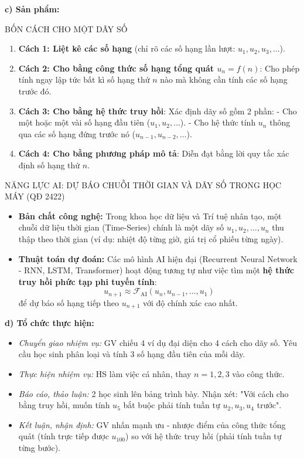 \documentclass[12pt, a4paper]{article}
\begin{document}
\noindent \textbf{c) Sản phẩm:}  
  
\begin{pedabox}{BỐN CÁCH CHO MỘT DÃY SỐ}  
\begin{enumerate}[leftmargin=0.6cm]  
    \item \textbf{Cách 1: Liệt kê các số hạng} (chỉ rõ các số hạng lần lượt: $u_1, u_2, u_3,\dots$).  
    \item \textbf{Cách 2: Cho bằng công thức số hạng tổng quát $u_n = f(n)$}:  
    Cho phép tính ngay lập tức bất kì số hạng thứ $n$ nào mà không cần tính các số hạng trước đó.  
    \item \textbf{Cách 3: Cho bằng hệ thức truy hồi}:  
    Xác định dãy số gồm 2 phần:  
    - Cho một hoặc một vài số hạng đầu tiên ($u_1, u_2,\dots$).  
    - Cho hệ thức tính $u_n$ thông qua các số hạng đứng trước nó ($u_{n-1}, u_{n-2},\dots$).  
    \item \textbf{Cách 4: Cho bằng phương pháp mô tả}:  
    Diễn đạt bằng lời quy tắc xác định số hạng thứ $n$.  
\end{enumerate}  
\end{pedabox}  
  
\begin{aibox}{NĂNG LỰC AI: DỰ BÁO CHUỖI THỜI GIAN VÀ DÃY SỐ TRONG HỌC MÁY (QĐ 2422)}  
\begin{itemize}[leftmargin=0.6cm]  
    \item \textbf{Bản chất công nghệ:} Trong khoa học dữ liệu và Trí tuệ nhân tạo, một chuỗi dữ liệu thời gian (Time-Series) chính là một dãy số $u_1, u_2, \dots, u_n$ thu thập theo thời gian (ví dụ: nhiệt độ từng giờ, giá trị cổ phiếu từng ngày).  
    \item \textbf{Thuật toán dự đoán:} Các mô hình AI hiện đại (Recurrent Neural Network - RNN, LSTM, Transformer) hoạt động tương tự như việc tìm một \textbf{hệ thức truy hồi phức tạp phi tuyến tính}:  
    $$u_{n+1} \approx \mathcal{F}_{\text{AI}}(u_n, u_{n-1}, \dots, u_1)$$  
    để dự báo số hạng tiếp theo $u_{n+1}$ với độ chính xác cao nhất.  
\end{itemize}  
\end{aibox}  
  
\noindent \textbf{d) Tổ chức thực hiện:}  
\begin{itemize}[leftmargin=0.8cm]  
    \item \textit{Chuyển giao nhiệm vụ:} GV chiếu 4 ví dụ đại diện cho 4 cách cho dãy số. Yêu cầu học sinh phân loại và tính 3 số hạng đầu tiên của mỗi dãy.  
    \item \textit{Thực hiện nhiệm vụ:} HS làm việc cá nhân, thay $n = 1, 2, 3$ vào công thức.  
    \item \textit{Báo cáo, thảo luận:} 2 học sinh lên bảng trình bày. Nhận xét: "Với cách cho bằng truy hồi, muốn tính $u_5$ bắt buộc phải tính tuần tự $u_2, u_3, u_4$ trước".  
    \item \textit{Kết luận, nhận định:} GV nhấn mạnh ưu - nhược điểm của công thức tổng quát (tính trực tiếp được $u_{100}$) so với hệ thức truy hồi (phải tính tuần tự từng bước).  
\end{itemize}  
  
\end{document}
